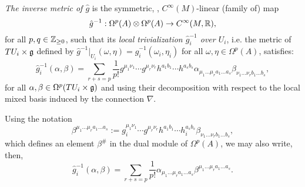 \begin{definition}
\emph{The inverse metric of $\hat g$} is the symmetric, , $C^\infty(M)$-linear (family of) map
\begin{equation}
    \hat g^{-1}: \Omega^p(A) \otimes \Omega^p(A) \to C^\infty(M, \mathbb{R}),
\end{equation}
for all $p, q \in \mathbb{Z}_{\geq 0}$, such that its \emph{local trivialization $\hat g_i^{-1}$ over $U_i$}, i.e. the metric of $TU_i \times \mathfrak{g}$ defined by $\hat g^{-1}|_{U_i}(\omega, \eta) = \hat g_i^{-1} (\omega_i, \eta_i)$ for all $\omega, \eta \in \Omega^p(A)$, satisfies:
\begin{equation*}
    \hat g_i^{-1} (\alpha, \beta) 
    = \sum_{r+s = p} \frac{1}{p!}  g^{\mu_1 \nu_1} \cdots g^{\mu_r \nu_r} h^{a_1 b_1} \cdots h^{a_s b_s} \alpha_{\mu_1 \dots \mu_r a_1 \dots a_s} \beta_{\nu_1 \dots \nu_r b_1 \dots  b_s},
\end{equation*}
for all $\alpha, \beta \in \Omega^p(TU_i \times \mathfrak{g})$ and using their decomposition with respect to the local mixed basis induced by the connection $\nabla$. 

Using the notation
\begin{equation}
    \beta^{\mu_1 \dots \mu_r a_1 \dots a_s} := g_i^{\mu_1 \nu_1} \cdots g^{\mu_r \nu_r} h^{a_1 b_1} \cdots h_i^{a_s b_s} \beta_{\nu_1 \dots \nu_r b_1 \dots  b_s},
\end{equation}
which defines an element $\beta^\#$ in the dual module of $\Omega^p(A)$, we may also write, then,
\begin{equation}
    \hat g_i^{-1}(\alpha, \beta) = \sum_{r+s = p} \frac{1}{p!} \alpha_{\mu_1 \dots \mu_r a_1 \dots a_s} \beta^{\mu_1 \dots \mu_r a_1 \dots  a_s}.
\end{equation}
\end{definition}

